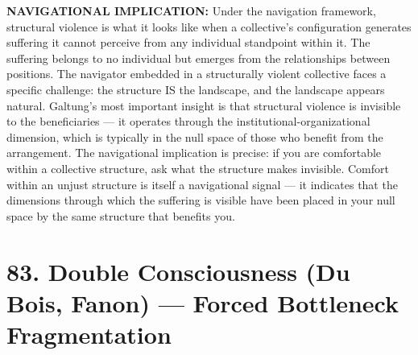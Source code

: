 \textbf{NAVIGATIONAL IMPLICATION:} Under the navigation framework, structural violence is what it looks like when a collective's configuration generates suffering it cannot perceive from any individual standpoint within it. The suffering belongs to no individual but emerges from the relationships between positions. The navigator embedded in a structurally violent collective faces a specific challenge: the structure IS the landscape, and the landscape appears natural. Galtung's most important insight is that structural violence is invisible to the beneficiaries — it operates through the institutional-organizational dimension, which is typically in the null space of those who benefit from the arrangement. The navigational implication is precise: if you are comfortable within a collective structure, ask what the structure makes invisible. Comfort within an unjust structure is itself a navigational signal — it indicates that the dimensions through which the suffering is visible have been placed in your null space by the same structure that benefits you.


\bigskip\noindent\makebox[\textwidth]{\color{rulegray}\rule{5cm}{0.3pt}}\bigskip


\section*{83. Double Consciousness (Du Bois, Fanon) — Forced Bottleneck Fragmentation}


